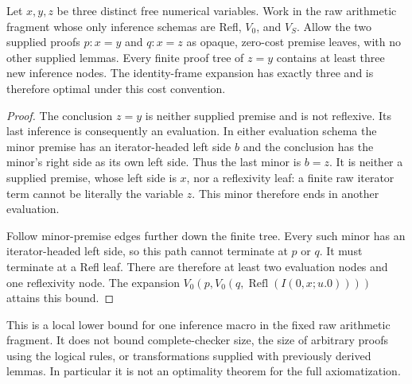 \begin{proposition}
Let $x,y,z$ be three distinct free numerical variables. Work in the raw
arithmetic fragment whose only inference schemas are Refl, $V_0$, and
$V_S$. Allow the two supplied proofs $p:x=y$ and $q:x=z$ as opaque,
zero-cost premise leaves, with no other supplied lemmas. Every finite
proof tree of $z=y$ contains at least three new inference nodes.
The identity-frame expansion has exactly three and is therefore optimal
under this cost convention.
\end{proposition}
\begin{proof}
The conclusion $z=y$ is neither supplied premise and is not reflexive.
Its last inference is consequently an evaluation. In either evaluation
schema the minor premise has an iterator-headed left side $b$ and the
conclusion has the minor's right side as its own left side. Thus the
last minor is $b=z$. It is neither a supplied premise, whose left side
is $x$, nor a reflexivity leaf: a finite raw iterator term cannot be
literally the variable $z$. This minor therefore ends in another
evaluation.

Follow minor-premise edges further down the finite tree. Every such
minor has an iterator-headed left side, so this path cannot terminate
at $p$ or $q$. It must terminate at a Refl leaf. There are therefore
at least two evaluation nodes and one reflexivity node. The expansion
$V_0(p,V_0(q,\operatorname{Refl}(I(0,x;u.0))))$ attains this bound.
\end{proof}

This is a local lower bound for one inference macro in the fixed raw
arithmetic fragment. It does not bound complete-checker size, the size
of arbitrary proofs using the logical rules, or transformations supplied
with previously derived lemmas. In particular it is not an optimality
theorem for the full axiomatization.
